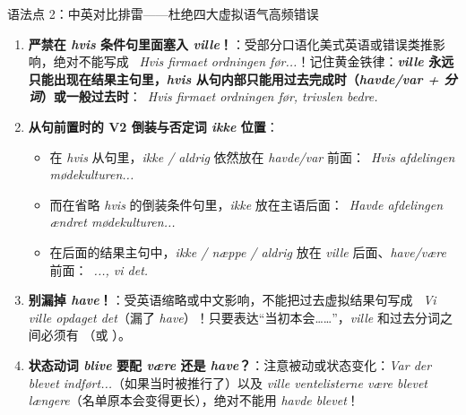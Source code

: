 \begin{grammatikbox}{语法点 2：中英对比排雷——杜绝四大虚拟语气高频错误}
\begin{enumerate}
  \item \textbf{严禁在 \textit{hvis} 条件句里面塞入 \textit{ville}！}：受部分口语化美式英语或错误类推影响，绝对不能写成 \ \textit{Hvis firmaet  ordningen før...}！记住黄金铁律：\textbf{\textit{ville} 永远只能出现在结果主句里，\textit{hvis} 从句内部只能用过去完成时（\textit{havde/var + 分词}）或一般过去时}：\ \textit{Hvis firmaet  ordningen før,  trivslen  bedre.}
  \item \textbf{从句前置时的 V2 倒装与否定词 \textit{ikke} 位置}：
    \begin{itemize}
      \item 在 \textit{hvis} 从句里，\textit{ikke / aldrig} 依然放在 \textit{havde/var} 前面：\ \textit{Hvis afdelingen  mødekulturen...}
      \item 而在省略 \textit{hvis} 的倒装条件句里，\textit{ikke} 放在主语后面：\ \textit{Havde afdelingen  ændret mødekulturen...}
      \item 在后面的结果主句中，\textit{ikke / næppe / aldrig} 放在 \textit{ville} 后面、\textit{have/være} 前面：\ \textit{...,  vi  det.}
    \end{itemize}
  \item \textbf{别漏掉 \textit{have}！}：受英语缩略或中文影响，不能把过去虚拟结果句写成 \ \textit{Vi ville opdaget det}（漏了 \textit{have}）！只要表达“当初本会……”，\textit{ville} 和过去分词之间必须有 （或 ）。
  \item \textbf{状态动词 \textit{blive} 要配 \textit{være} 还是 \textit{have}？}：注意被动或状态变化：\textit{Var der blevet indført...}（如果当时被推行了）以及 \textit{ville ventelisterne være blevet længere}（名单原本会变得更长），绝对不能用 \textit{havde blevet}！
\end{enumerate}
\end{grammatikbox}


